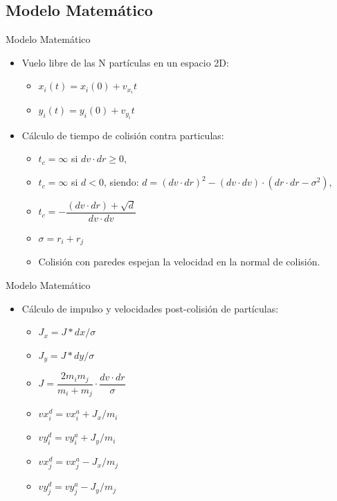 \documentclass{beamer}
\begin{document}
\subsection{Modelo Matemático}
\begin{frame}{Modelo Matemático}
  \begin{itemize}
    \item Vuelo libre de las N partículas en un espacio 2D:
    \begin{itemize}
      \item $x_i(t) = x_i(0) + v_{x_i} t$
      \item $y_i(t) = y_i(0) + v_{y_i} t$
    \end{itemize}
    \item Cálculo de tiempo de colisión contra particulas:
    \begin{itemize}
      \item $t_{c} = \infty$ si $dv \cdot dr \geqslant 0$,
      \item $t_{c} = \infty$ si $d < 0$, siendo: $d = (dv \cdot dr)^2 - (dv \cdot dv)\cdot(dr \cdot dr - \sigma^2 )$,
      \item $t_{c} = -\dfrac{(dv \cdot dr) + \sqrt{d}}{dv \cdot dv}$
      \item $\sigma = r_i + r_j$
      \item Colisión con paredes espejan la velocidad en la normal de colisión.
    \end{itemize}
  \end{itemize}
\end{frame}

\begin{frame}{Modelo Matemático}
  \begin{itemize}
    \item Cálculo de impulso y velocidades post-colisión de partículas:
      \begin{itemize}
        \item $J_x = J*dx/\sigma$
        \item $J_y = J*dy/\sigma$
        \item $J = \dfrac{2 m_i m_j}{m_i + m_j} \cdot \dfrac{dv \cdot dr}{\sigma}$
        \item $vx_i^d = vx_i^a + J_x/m_i$
        \item $vy_i^d = vy_i^a + J_y/m_i$
        \item $vx_j^d = vx_j^a - J_x/m_j$
        \item $vy_j^d = vy_j^a - J_y/m_j$
      \end{itemize}
  \end{itemize}
\end{frame}
\end{document}
